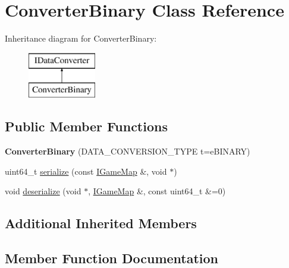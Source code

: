 \hypertarget{class_converter_binary}{}\section{Converter\+Binary Class Reference}
\label{class_converter_binary}
Inheritance diagram for Converter\+Binary\+:\begin{figure}[H]
\begin{center}
\leavevmode
\includegraphics[height=2.000000cm]{class_converter_binary}
\end{center}
\end{figure}
\subsection*{Public Member Functions}
\begin{DoxyCompactItemize}
\item 
\hypertarget{class_converter_binary_a939563c4bed120155ba40142df71254b}{}{\bfseries Converter\+Binary} (D\+A\+T\+A\+\_\+\+C\+O\+N\+V\+E\+R\+S\+I\+O\+N\+\_\+\+T\+Y\+P\+E t=e\+B\+I\+N\+A\+R\+Y)\label{class_converter_binary_a939563c4bed120155ba40142df71254b}

\item 
uint64\+\_\+t \hyperlink{class_converter_binary_a78c1d5f73f39144c4965d0a324aa35a4}{serialize} (const \hyperlink{class_i_game_map}{I\+Game\+Map} \&, void $\ast$)
\item 
void \hyperlink{class_converter_binary_a5f46bc4ad8cd08b419f174f5fcb7ac38}{deserialize} (void $\ast$, \hyperlink{class_i_game_map}{I\+Game\+Map} \&, const uint64\+\_\+t \&=0)
\end{DoxyCompactItemize}
\subsection*{Additional Inherited Members}


\subsection{Member Function Documentation}
\hypertarget{class_converter_binary_a5f46bc4ad8cd08b419f174f5fcb7ac38}{}
